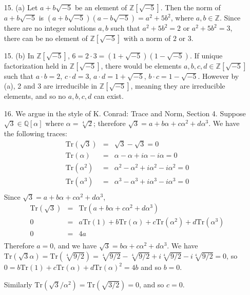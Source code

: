 \documentclass{article}
\newcommand{\zquad}[1]{\mathbb{Z}[\sqrt{#1}]}
\newcommand{\qext}[1]{\mathbb{Q}[#1]}
\newcommand{\trace}[1]{\text{Tr}(#1)}
\begin{document}
\begin{enumerate}
\item[15. (a)] Let $a + b\sqrt{-5}$ be an element of $\zquad{-5}$.  Then the norm of $a + b\sqrt{-5}$ is $(a + b\sqrt{-5})(a - b\sqrt{-5}) = a^2 + 5b^2$, where $a, b \in \mathbb{Z}$.  Since there are no integer solutions $a, b$ such that $a^2 + 5b^2 = 2$ or $a^2 + 5b^2 = 3$, there can be no element of $\zquad{-5}$ with a norm of $2$ or $3$.
\item[15. (b)] In $\zquad{-5}$, $6 = 2 \cdot 3 = (1 + \sqrt{-5})(1 - \sqrt{-5})$.  If unique factorization held in $\zquad{-5}$, there would be elements $a, b, c, d \in \zquad{-5}$ such that $a \cdot b = 2$, $c \cdot d = 3$, $a \cdot d  =  1 + \sqrt{-5}$, $b \cdot c = 1 - \sqrt{-5}$.
    However by (a), 2 and 3 are irreducible in $\zquad{-5}$, meaning they are irreducible elements, and so no $a, b, c, d$ can exist.

\item[16.]
We argue in the style of K. Conrad: Trace and Norm, Section 4.  Suppose $\sqrt{3} \in \qext{\alpha}$ where $\alpha = \sqrt[4]{2}$; therefore $\sqrt{3} = a + b\alpha + c\alpha^2 + d\alpha^3$.  We have the following traces:
\begin{eqnarray*}
    \trace{\sqrt{3}} &=& \sqrt{3} - \sqrt{3} = 0 \\
    \trace{\alpha} &=& \alpha - \alpha + i\alpha - i\alpha = 0\\
    \trace{\alpha^2} &=& \alpha^2 - \alpha^2 + i\alpha^2 - i\alpha^2 = 0\\
    \trace{\alpha^3} &=& \alpha^3 - \alpha^3 + i\alpha^3 - i\alpha^3 = 0\\
\end{eqnarray*}
Since $\sqrt{3} = a + b\alpha + c\alpha^2 + d\alpha^3$,
\begin{eqnarray*}
    \trace{\sqrt{3}} &=& \trace{a + b\alpha + c\alpha^2 + d\alpha^3} \\
    0 &=& a\trace{1} + b\trace{\alpha} + c\trace{\alpha^2} + d\trace{\alpha^3} \\
    0 &=& 4a \\
\end{eqnarray*}
Therefore $a = 0$, and we have $\sqrt{3} = b\alpha + c\alpha^2 + d\alpha^3$.  We have $\trace{\sqrt{3}\alpha} = \trace{\sqrt[4]{9/2}} = \sqrt[4]{9/2} - \sqrt[4]{9/2} + i\sqrt[4]{9/2} - i\sqrt[4]{9/2} = 0$, so $0 = b\trace{1} + c\trace{\alpha} + d\trace{\alpha}^2 = 4b$ and so $b = 0$.

Similarly $\trace{\sqrt{3}/\alpha^2} = \trace{\sqrt{3/2}} = 0$, and so $c = 0$.


\end{enumerate}
\end{document}
